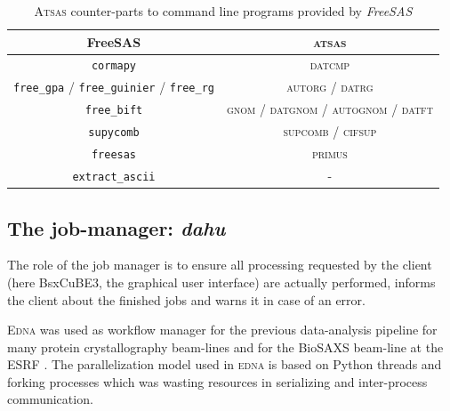 \documentclass[preprint]{iucr}              %
\begin{document}
\begin{table}
    \label{freesas-atsas}
    \caption{\textsc{Atsas} counter-parts to command line programs provided by \textit{FreeSAS}}
    \begin{center}
    \begin{tabular}{|c|c|}
        \hline
        FreeSAS & \textsc{atsas} \\
        \hline
        \texttt{cormapy} & \textsc{datcmp}\\
        \texttt{free\_gpa} / \texttt{free\_guinier} / \texttt{free\_rg}& \textsc{autorg} / \textsc{datrg}\\
        \texttt{free\_bift}& \textsc{gnom} / \textsc{datgnom} / \textsc{autognom} / \textsc{datft}\\
        \texttt{supycomb}& \textsc{supcomb} / \textsc{cifsup} \\
        \texttt{freesas}& \textsc{primus}\\
        \texttt{extract\_ascii}& - \\
        \hline
    \end{tabular}
    \end{center}
    
\end{table}

\subsection{The job-manager: \textit{dahu}}

The role of the job manager is to ensure all processing requested by the client (here BsxCuBE3, the graphical user interface) are actually performed, informs the client about the finished jobs and warns it in case of an error.


\textsc{Edna} was used as workflow manager for the previous data-analysis pipeline for many protein crystallography beam-lines \cite{edna} and for the BioSAXS beam-line at the ESRF \cite{BM29ODA}.
The parallelization model used in \textsc{edna} is based on Python threads and forking processes which was wasting resources in serializing and inter-process communication. 
 
\end{document}
